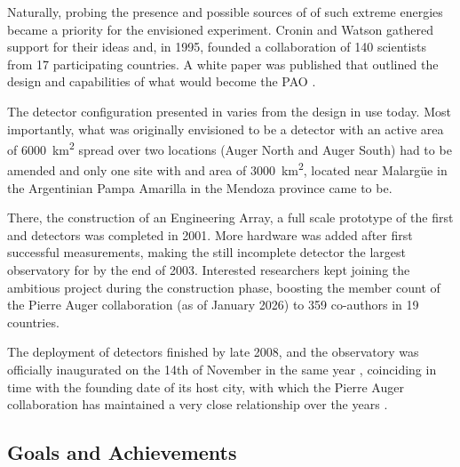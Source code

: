 Naturally, probing the presence and possible sources of \CRs of such extreme 
energies became a priority for the envisioned experiment. Cronin and Watson 
gathered support for their ideas and, in 1995, founded a collaboration of 140 
scientists from 17 participating countries. A white paper was published that 
outlined the design and capabilities of what would become the \acl{PAO} 
\cite{thepierreaugercollaborationPierreAugerObservatory1997}. 

The detector configuration presented in
\cite{thepierreaugercollaborationPierreAugerObservatory1997} varies from the 
design in use today. Most importantly, what was originally envisioned to 
be a detector with an active area of \SI{6000}{\km\squared} spread over two 
locations (Auger North and Auger South) had to be amended and only one site 
with and area of \SI{3000}{\km\squared}, located near Malargüe in the 
Argentinian Pampa Amarilla in the Mendoza province came to be. 

There, the construction of an Engineering Array, a full scale prototype of the 
first \SD and \FD detectors was completed in 2001. More hardware was added 
after first successful measurements, making the still incomplete detector the 
largest observatory for \CRs by the end of 2003. Interested researchers kept 
joining the ambitious project during the construction phase, boosting the 
member count of the Pierre Auger collaboration (as of January 2026) to 359 
co-authors in 19 countries.

The deployment of detectors finished by late 2008, and the observatory was 
officially inaugurated on the 14th of November in the same year 
\cite{InaugurationPierreAuger}, coinciding in time with the founding date of
its host city, with which the Pierre Auger collaboration has maintained a very 
close relationship over the years \cite{JamesCroninSchool, 
MalargueObservatorioPierre, NicolasLealMalarguino2025, 
allekotteMalargueStreets26}.

\subsection{Goals and Achievements}
\label{ssec:science-goals-and-achievements}

